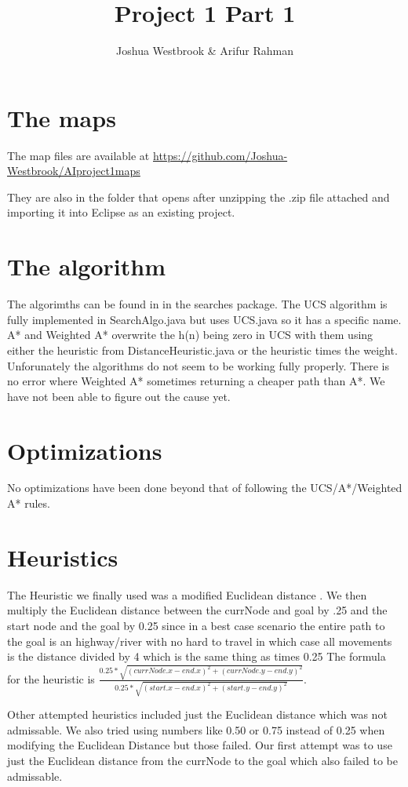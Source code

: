 \documentclass[11pt]{article} %
\title{Project 1 Part 1}
\author{Joshua Westbrook \& Arifur Rahman}
\date{} %
\begin{document}
\maketitle

\section{The maps}

The map files are available at \url{https://github.com/Joshua-Westbrook/AIproject1maps}

They are also in the folder that opens after unzipping the .zip file attached and importing it into Eclipse as an existing project.

\section{The algorithm}

The algorimths can be found in in the searches package. The UCS algorithm is fully implemented in SearchAlgo.java but uses UCS.java so it has a specific name. A* and Weighted A* overwrite the h(n) being zero in UCS with them using either the heuristic from DistanceHeuristic.java or the heuristic times the weight. Unforunately the algorithms do not seem to be working fully properly. There is no error where Weighted A* sometimes returning a cheaper path than A*. We have not been able to figure out the cause yet.

\section{Optimizations}
No optimizations have been done beyond that of following the UCS/A*/Weighted A* rules.

\section{Heuristics}
The Heuristic we finally used was a modified Euclidean distance . We then multiply the Euclidean distance between the currNode and goal by .25 and the start node and the goal by 0.25 since in a best case scenario the entire path to the goal is an highway/river with no hard to travel in which case all movements is the distance divided by 4 which is the same thing as times 0.25
The formula for the heuristic is $\frac{0.25 * \sqrt{(currNode.x - end.x)^2 + (currNode.y - end.y)^2}}{0.25 * \sqrt{(start.x - end.x)^2 + (start.y - end.y)^2}}$.

Other attempted heuristics included just the Euclidean distance which was not admissable. We also tried using numbers like 0.50 or 0.75 instead of 0.25 when modifying the Euclidean  Distance but those failed. Our first attempt was to use just the Euclidean distance from the currNode to the goal which also failed to be admissable.
\end{document}
